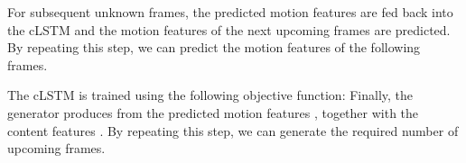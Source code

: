 For subsequent unknown frames, the predicted motion features are fed back into the cLSTM and the motion features of the next upcoming frames are predicted. By repeating this step, we can predict the motion features of the following  frames.

The cLSTM is trained using the following objective function:
\small{
}
Finally, the generator produces  from the  predicted motion features , together with the content features . By repeating this step, we can generate the required number of upcoming frames.
